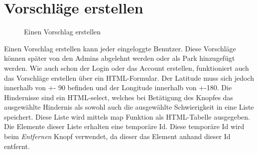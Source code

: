 \section{Vorschläge erstellen}
\label{vorschläge}

\begin{figure}[H]
    \begin{center}
      \caption{Einen Vorschlag erstellen}
    \end{center}
\end{figure}

Einen Vorschlag erstellen kann jeder eingeloggte Benutzer. Diese Vorschläge können später von den 
Admins abgelehnt werden oder als Park hinzugefügt werden. Wie auch schon der Login oder das Account 
erstellen, funktioniert auch das Vorschläge erstellen über ein HTML-Formular. Der Latitude muss sich 
jedoch innerhalb von +- 90 befinden und der Longitude innerhalb von +-180. Die Hindernisse sind
ein HTML-select, welches bei Betätigung des Knopfes das ausgewählte Hindernis als sowohl auch die ausgewählte Schwierigkeit 
in eine Liste speichert. Diese Liste wird mittels map Funktion als HTML-Tabelle ausgegeben. Die 
Elemente dieser Liste erhalten eine temporäre Id. Diese temporäre Id wird beim \textit{Entfernen} 
Knopf verwendet, da dieser das Element anhand dieser Id entfernt. 